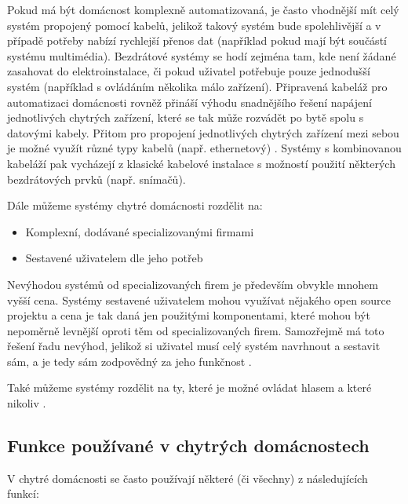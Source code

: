 Pokud má být domácnost komplexně automatizovaná, je často vhodnější mít celý systém propojený pomocí kabelů, jelikož takový systém bude spolehlivější a v případě potřeby nabízí rychlejší přenos dat (například pokud mají být součástí systému multimédia). Bezdrátové systémy se hodí zejména tam, kde není žádané zasahovat do elektroinstalace, či pokud uživatel potřebuje pouze jednodušší systém (například s ovládáním několika málo zařízení). Připravená kabeláž pro automatizaci domácnosti rovněž přináší výhodu snadnějšího řešení napájení jednotlivých chytrých zařízení, které se tak může rozvádět po bytě spolu s datovými kabely. Přitom pro propojení jednotlivých chytrých zařízení mezi sebou je možné využít různé typy kabelů (např. ethernetový) \cite{CoJeSmartHome}. Systémy s kombinovanou kabeláží pak vycházejí z klasické kabelové instalace s možností použití některých bezdrátových prvků (např. snímačů).

Dále můžeme systémy chytré domácnosti rozdělit na:
\begin{itemize}
\item Komplexní, dodávané specializovanými firmami
\item Sestavené uživatelem dle jeho potřeb
\end{itemize}

Nevýhodou systémů od specializovaných firem je především obvykle mnohem vyšší cena. Systémy sestavené uživatelem mohou využívat nějakého open source projektu a cena je tak daná jen použitými komponentami, které mohou být nepoměrně levnější oproti těm od specializovaných firem. Samozřejmě má toto řešení řadu nevýhod, jelikož si uživatel musí celý systém navrhnout a sestavit sám, a je tedy sám zodpovědný za jeho funkčnost \cite{DIYHomeAutomationVsProfessionallyInstalled}. 

Také můžeme systémy rozdělit na ty, které je možné ovládat hlasem a které nikoliv \cite{SmartHomeWithoutVoiceAssistant}.

\subsection*{Funkce používané v chytrých domácnostech}
V chytré domácnosti se často používají některé (či všechny) z následujících funkcí:

